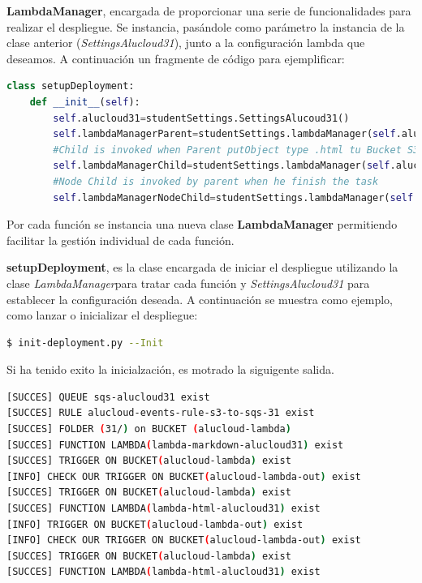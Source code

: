\documentclass[
]{article}
\begin{document}
\textbf{LambdaManager}, encargada de proporcionar una serie de
funcionalidades para realizar el despliegue. Se instancia, pasándole
como parámetro la instancia de la clase anterior
(\emph{SettingsAlucloud31}), junto a la configuración lambda que
deseamos. A continuación un fragmente de código para ejemplificar:

\begin{lstlisting}[language=Python,caption={Instancias de LambdaManager}]
class setupDeployment:
    def __init__(self):
        self.alucloud31=studentSettings.SettingsAlucoud31()
        self.lambdaManagerParent=studentSettings.lambdaManager(self.alucloud31,self.alucloud31.configParent)
        #Child is invoked when Parent putObject type .html tu Bucket S3
        self.lambdaManagerChild=studentSettings.lambdaManager(self.alucloud31,self.alucloud31.configChild)
        #Node Child is invoked by parent when he finish the task
        self.lambdaManagerNodeChild=studentSettings.lambdaManager(self.alucloud31,self.alucloud31.configChildNode)
\end{lstlisting}

Por cada función se instancia una nueva clase \textbf{LambdaManager}
permitiendo facilitar la gestión individual de cada función.

\textbf{setupDeployment}, es la clase encargada de iniciar el despliegue
utilizando la clase \emph{LambdaManager}para tratar cada función y
\emph{SettingsAlucloud31} para establecer la configuración deseada. A
continuación se muestra como ejemplo, como lanzar o inicializar el
despliegue:

\begin{lstlisting}[language=bash,caption={Iniciar despliegue}]
$ init-deployment.py --Init
\end{lstlisting}

Si ha tenido exito la inicialzación, es motrado la siguigente salida.


\begin{lstlisting}[language=bash,caption={Salida Exitosa}]
[SUCCES] QUEUE sqs-alucloud31 exist
[SUCCES] RULE alucloud-events-rule-s3-to-sqs-31 exist
[SUCCES] FOLDER (31/) on BUCKET (alucloud-lambda)
[SUCCES] FUNCTION LAMBDA(lambda-markdown-alucloud31) exist
[SUCCES] TRIGGER ON BUCKET(alucloud-lambda) exist
[INFO] CHECK OUR TRIGGER ON BUCKET(alucloud-lambda-out) exist
[SUCCES] TRIGGER ON BUCKET(alucloud-lambda) exist
[SUCCES] FUNCTION LAMBDA(lambda-html-alucloud31) exist
[INFO] TRIGGER ON BUCKET(alucloud-lambda-out) exist
[INFO] CHECK OUR TRIGGER ON BUCKET(alucloud-lambda-out) exist
[SUCCES] TRIGGER ON BUCKET(alucloud-lambda) exist
[SUCCES] FUNCTION LAMBDA(lambda-html-alucloud31) exist
\end{lstlisting}
\end{document}
